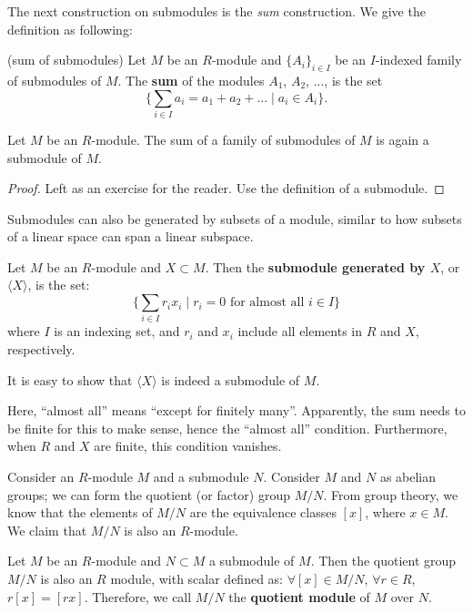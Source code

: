 \documentclass[12pt, a4paper, titlepage]{report}
\newcommand\dangle[1]{\langle {#1} \rangle}
\begin{document}
The next construction on submodules is the \textit{sum} construction. We give the definition as following:

\begin{defn}(sum of submodules)
  Let $M$ be an $R$-module and $\{A_i\}_{i \in I}$ be an $I$-indexed family of submodules of $M$. The \textbf{sum} of the
  modules $A_1$, $A_2$, ..., is the set
  \[
    \{ \sum_{i \in I} a_i = a_1 + a_2 + ... \mid a_i \in A_i \}.
  \]
\end{defn}

\begin{thm}
  Let $M$ be an $R$-module. The sum of a family of submodules of $M$ is again a submodule of $M$.
\end{thm}

\begin{proof}
  Left as an exercise for the reader. Use the definition of a submodule.
\end{proof}

Submodules can also be generated by subsets of a module, similar to how subsets of a linear space can span a linear subspace.

\begin{defn}
  Let $M$ be an $R$-module and $X \subset M$. Then the \textbf{submodule generated by $X$}, or $\dangle{X}$, is the set:
  \[
    \{ \sum_{i \in I} r_ix_i \mid r_i = 0 \text{ for almost all } i \in I \}
  \]
  where $I$ is an indexing set, and $r_i$ and $x_i$ include all elements in $R$ and $X$, respectively.
\end{defn}

It is easy to show that $\dangle{X}$ is indeed a submodule of $M$.

\begin{rem}
  Here, ``almost all'' means ``except for finitely many''. Apparently, the sum needs to be finite for this to make sense, hence
  the ``almost all'' condition. Furthermore, when $R$ and $X$ are finite, this condition vanishes.
\end{rem}

Consider an $R$-module $M$ and a submodule $N$. Consider $M$ and $N$ as abelian groups; we can form the quotient (or factor)
group $M/N$. From group theory, we know that the elements of $M/N$ are the equivalence classes $[x]$, where $x \in M$.
We claim that $M/N$ is also an $R$-module.

\begin{thm}
  Let $M$ be an $R$-module and $N \subset M$ a submodule of $M$. Then the quotient group $M/N$ is also an $R$ module, with
  scalar defined as: $\forall [x] \in M/N$, $\forall r \in R$, $r[x] = [rx]$. Therefore, we call $M/N$ the \textbf{quotient module}
  of $M$ over $N$.
\end{thm}
\end{document}
